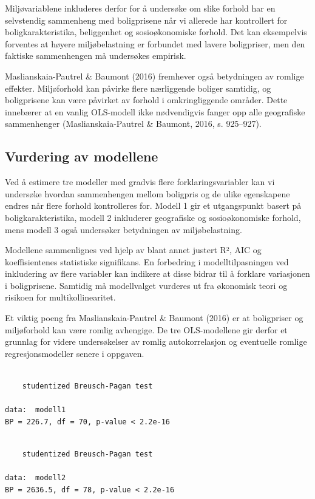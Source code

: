 \documentclass[
  norsk,
  a4paper,
]{article}
\begin{document}
Miljøvariablene inkluderes derfor for å undersøke om slike forhold har
en selvstendig sammenheng med boligprisene når vi allerede har
kontrollert for boligkarakteristika, beliggenhet og sosioøkonomiske
forhold. Det kan eksempelvis forventes at høyere miljøbelastning er
forbundet med lavere boligpriser, men den faktiske sammenhengen må
undersøkes empirisk.

Maslianskaia-Pautrel \& Baumont (2016) fremhever også betydningen av
romlige effekter. Miljøforhold kan påvirke flere nærliggende boliger
samtidig, og boligprisene kan være påvirket av forhold i omkringliggende
områder. Dette innebærer at en vanlig OLS-modell ikke nødvendigvis
fanger opp alle geografiske sammenhenger (Maslianskaia-Pautrel \&
Baumont, 2016, s. 925--927).

\subsection{Vurdering av modellene}\label{vurdering-av-modellene}

Ved å estimere tre modeller med gradvis flere forklaringsvariabler kan
vi undersøke hvordan sammenhengen mellom boligpris og de ulike
egenskapene endres når flere forhold kontrolleres for. Modell 1 gir et
utgangspunkt basert på boligkarakteristika, modell 2 inkluderer
geografiske og sosioøkonomiske forhold, mens modell 3 også undersøker
betydningen av miljøbelastning.

Modellene sammenlignes ved hjelp av blant annet justert R², AIC og
koeffisientenes statistiske signifikans. En forbedring i
modelltilpasningen ved inkludering av flere variabler kan indikere at
disse bidrar til å forklare variasjonen i boligprisene. Samtidig må
modellvalget vurderes ut fra økonomisk teori og risikoen for
multikollinearitet.

Et viktig poeng fra Maslianskaia-Pautrel \& Baumont (2016) er at
boligpriser og miljøforhold kan være romlig avhengige. De tre
OLS-modellene gir derfor et grunnlag for videre undersøkelser av romlig
autokorrelasjon og eventuelle romlige regresjonsmodeller senere i
oppgaven.

\begin{verbatim}

    studentized Breusch-Pagan test

data:  modell1
BP = 226.7, df = 70, p-value < 2.2e-16
\end{verbatim}

\begin{verbatim}

    studentized Breusch-Pagan test

data:  modell2
BP = 2636.5, df = 78, p-value < 2.2e-16
\end{verbatim}
\end{document}
